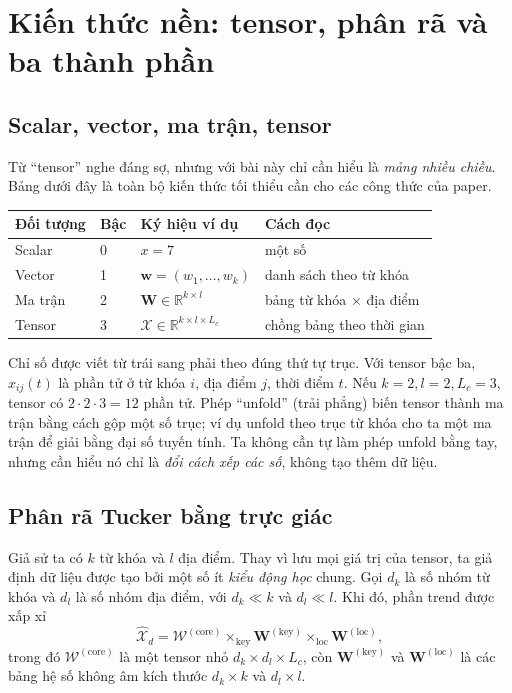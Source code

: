 \section{Kiến thức nền: tensor, phân rã và ba thành phần}
\label{sec:tensor-primer}

\subsection{Scalar, vector, ma trận, tensor}

Từ ``tensor'' nghe đáng sợ, nhưng với bài này chỉ cần hiểu là \emph{mảng nhiều chiều}. Bảng
dưới đây là toàn bộ kiến thức tối thiểu cần cho các công thức của paper.

\begin{center}
\small
\begin{tabular}{@{}llll@{}}
  \toprule
  Đối tượng & Bậc & Ký hiệu ví dụ & Cách đọc \\
  \midrule
  Scalar & 0 & $x=7$ & một số \\
  Vector & 1 & $\mathbf{w}=(w_1,\ldots,w_k)$ & danh sách theo từ khóa \\
  Ma trận & 2 & $\mathbf{W}\in\mathbb{R}^{k\times l}$ & bảng từ khóa $\times$ địa điểm \\
  Tensor & 3 & $\mathcal{X}\in\mathbb{R}^{k\times l\times L_c}$ & chồng bảng theo thời gian \\
  \bottomrule
\end{tabular}
\end{center}

Chỉ số được viết từ trái sang phải theo đúng thứ tự trục. Với tensor bậc ba, $x_{ij}(t)$ là phần
tử ở từ khóa $i$, địa điểm $j$, thời điểm $t$. Nếu $k=2,l=2,L_c=3$, tensor có $2\cdot2\cdot3=12$
phần tử. Phép ``unfold'' (trải phẳng) biến tensor thành ma trận bằng cách gộp một số trục; ví dụ
unfold theo trục từ khóa cho ta một ma trận để giải bằng đại số tuyến tính. Ta không cần tự làm
phép unfold bằng tay, nhưng cần hiểu nó chỉ là \emph{đổi cách xếp các số}, không tạo thêm dữ liệu.

\subsection{Phân rã Tucker bằng trực giác}

Giả sử ta có $k$ từ khóa và $l$ địa điểm. Thay vì lưu mọi giá trị của tensor, ta giả định dữ liệu
được tạo bởi một số ít \emph{kiểu động học} chung. Gọi $d_k$ là số nhóm từ khóa và $d_l$ là số
nhóm địa điểm, với $d_k\ll k$ và $d_l\ll l$. Khi đó, phần trend được xấp xỉ
\begin{equation}
  \widehat{\mathcal{X}}_d
  =\mathcal{W}^{(\mathrm{core})}
   \times_{\mathrm{key}}\mathbf{W}^{(\mathrm{key})}
   \times_{\mathrm{loc}}\mathbf{W}^{(\mathrm{loc})},
  \label{eq:tucker-intuition}
\end{equation}
trong đó $\mathcal{W}^{(\mathrm{core})}$ là một tensor nhỏ $d_k\times d_l\times L_c$, còn
$\mathbf{W}^{(\mathrm{key})}$ và $\mathbf{W}^{(\mathrm{loc})}$ là các bảng hệ số không âm kích
thước $d_k\times k$ và $d_l\times l$.

